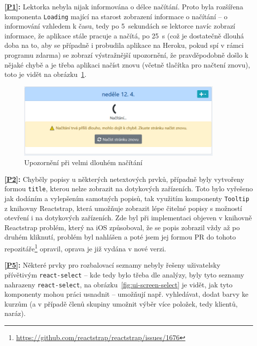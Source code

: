 \textbf{\ref{P1}:} Lektorka nebyla nijak informována o délce načítání. Proto byla rozšířena komponenta \verb|Loading| mající na starost zobrazení informace o načítání -- o informování vzhledem k času, tedy po 5~sekundách se lektorce navíc zobrazí informace, že aplikace stále pracuje a načítá, po 25~s (což je dostatečně dlouhá doba na to, aby se případně i probudila aplikace na Heroku, pokud spí v rámci programu zdarma) se zobrazí výstražnější upozornění, že pravděpodobně došlo k nějaké chybě a je třeba aplikaci načíst znovu (včetně tlačítka pro načtení znovu), toto je vidět na obrázku~\ref{fig:ui-screen-loading}.

\begin{figure}[h]\centering
    \includegraphics[width=0.9\textwidth]{img/ui-screen-loading.png}
    \caption{Upozornění při velmi dlouhém načítání}\label{fig:ui-screen-loading}
\end{figure}

\textbf{\ref{P2}:} Chyběly popisy u některých netextových prvků, případně byly vytvořeny formou \verb|title|, kterou nelze zobrazit na dotykových zařízeních. Toto bylo vyřešeno jak dodáním a vylepšením samotných popisů, tak využitím komponenty \verb|Tooltip| z knihovny Reactstrap, která umožňuje zobrazit lépe čitelné popisy s možností otevření i na dotykových zařízeních. Zde byl při implementaci objeven v knihovně Reactstrap problém, který na iOS způsoboval, že se popis zobrazil vždy až po druhém kliknutí, problém byl nahlášen a poté jsem jej formou PR do tohoto repozitáře\footnote{\url{https://github.com/reactstrap/reactstrap/issues/1676}} opravil, oprava je již vydána v nové verzi.

\textbf{\ref{P5}:} Některé prvky pro rozbalovací seznamy nebyly řešeny uživatelsky přívětivým \verb|react-select| -- kde tedy bylo třeba dle analýzy, byly tyto seznamy nahrazeny \verb|react-select|, na obrázku~\ref{fig:ui-screen-select} je vidět, jak tyto komponenty mohou práci usnadnit -- umožňují např. vyhledávat, dodat barvy ke kurzům (a v případě členů skupiny umožnit výběr více položek, tedy klientů, naráz).

